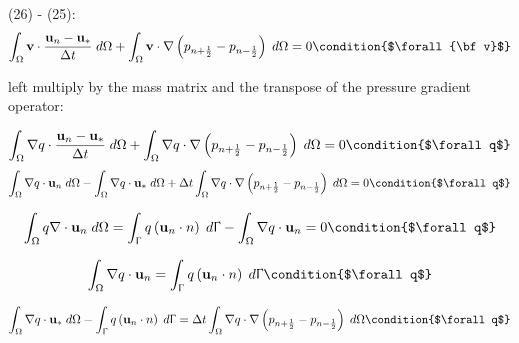 \documentclass[11pt,a4paper]{article}
\begin{document}
(26) - (25):
\begin{dmath}
  \int_\Omega {\bf v} \cdot \frac{{\bf u}_n - {\bf u}_*}{\Delta t} \; d\Omega + \int_\Omega {\bf v} \cdot \nabla \left(p_{n+\frac{1}{2}} - p_{n-\frac{1}{2}} \right) \; d\Omega = 0 \condition{$\forall {\bf v}$}
\end{dmath}

left multiply by the mass matrix and the transpose of the pressure gradient operator:

\begin{dmath}
  \int_\Omega \nabla q \cdot \frac{{\bf u}_n - {\bf u}_*}{\Delta t} \; d\Omega + \int_\Omega \nabla q \cdot \nabla \left(p_{n+\frac{1}{2}} - p_{n-\frac{1}{2}} \right) \; d\Omega = 0 \condition{$\forall q$}
\end{dmath}
\begin{dmath}
  \int_\Omega \nabla q \cdot {\bf u}_n \; d\Omega - \int_\Omega \nabla q \cdot {\bf u}_* \; d\Omega + \Delta t \int_\Omega \nabla q \cdot \nabla \left(p_{n+\frac{1}{2}} - p_{n-\frac{1}{2}} \right) \; d\Omega = 0 \condition{$\forall q$}
\end{dmath}

\begin{dmath}
  \int_\Omega q \nabla \cdot {\bf u}_{n} \; d\Omega = \int_\Upgamma q \left( {\bf u}_{n} \cdot n \right) \; d\Upgamma - \int_\Omega \nabla q \cdot {\bf u}_{n} = 0 \condition{$\forall q$}
\end{dmath}

\begin{dmath}
 \int_\Omega \nabla q \cdot {\bf u}_{n} = \int_\Upgamma q \left( {\bf u}_{n} \cdot n \right) \; d\Upgamma \condition{$\forall q$}
\end{dmath}

\begin{dmath}
  \int_\Omega \nabla q \cdot {\bf u}_* \; d\Omega - \int_\Upgamma q \left( {\bf u}_{n} \cdot n \right) \; d\Upgamma = \Delta t \int_\Omega \nabla q \cdot \nabla \left(p_{n+\frac{1}{2}} - p_{n-\frac{1}{2}} \right) \; d\Omega  \condition{$\forall q$}
\end{dmath}


\end{document}
